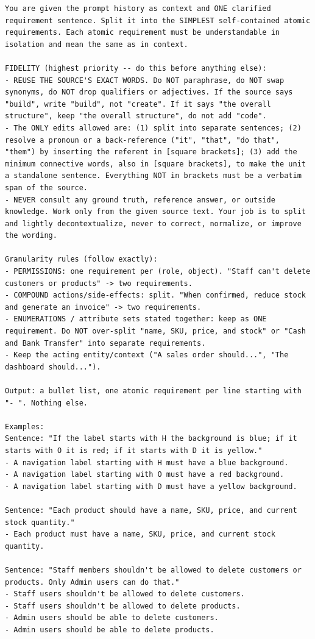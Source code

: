 \begin{lstlisting}[breaklines=true, basicstyle=\small\ttfamily, caption={Requirement-decomposition prompt applied to each candidate sentence.}, label={lst:decomp-prompt}]
You are given the prompt history as context and ONE clarified requirement sentence. Split it into the SIMPLEST self-contained atomic requirements. Each atomic requirement must be understandable in isolation and mean the same as in context.

FIDELITY (highest priority -- do this before anything else):
- REUSE THE SOURCE'S EXACT WORDS. Do NOT paraphrase, do NOT swap synonyms, do NOT drop qualifiers or adjectives. If the source says "build", write "build", not "create". If it says "the overall structure", keep "the overall structure", do not add "code".
- The ONLY edits allowed are: (1) split into separate sentences; (2) resolve a pronoun or a back-reference ("it", "that", "do that", "them") by inserting the referent in [square brackets]; (3) add the minimum connective words, also in [square brackets], to make the unit a standalone sentence. Everything NOT in brackets must be a verbatim span of the source.
- NEVER consult any ground truth, reference answer, or outside knowledge. Work only from the given source text. Your job is to split and lightly decontextualize, never to correct, normalize, or improve the wording.

Granularity rules (follow exactly):
- PERMISSIONS: one requirement per (role, object). "Staff can't delete customers or products" -> two requirements.
- COMPOUND actions/side-effects: split. "When confirmed, reduce stock and generate an invoice" -> two requirements.
- ENUMERATIONS / attribute sets stated together: keep as ONE requirement. Do NOT over-split "name, SKU, price, and stock" or "Cash and Bank Transfer" into separate requirements.
- Keep the acting entity/context ("A sales order should...", "The dashboard should...").

Output: a bullet list, one atomic requirement per line starting with "- ". Nothing else.

Examples:
Sentence: "If the label starts with H the background is blue; if it starts with O it is red; if it starts with D it is yellow."
- A navigation label starting with H must have a blue background.
- A navigation label starting with O must have a red background.
- A navigation label starting with D must have a yellow background.

Sentence: "Each product should have a name, SKU, price, and current stock quantity."
- Each product must have a name, SKU, price, and current stock quantity.

Sentence: "Staff members shouldn't be allowed to delete customers or products. Only Admin users can do that."
- Staff users shouldn't be allowed to delete customers.
- Staff users shouldn't be allowed to delete products.
- Admin users should be able to delete customers.
- Admin users should be able to delete products.
\end{lstlisting}

